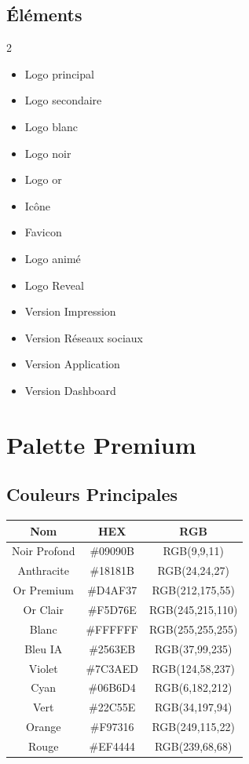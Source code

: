 \documentclass[12pt,a4paper,oneside]{book}
\begin{document}
\section{Éléments}
\begin{multicols}{2}
\begin{itemize}
\item Logo principal
\item Logo secondaire
\item Logo blanc
\item Logo noir
\item Logo or
\item Icône
\item Favicon
\item Logo animé
\item Logo Reveal
\item Version Impression
\item Version Réseaux sociaux
\item Version Application
\item Version Dashboard
\end{itemize}
\end{multicols}

\chapter{Palette Premium}

\section{Couleurs Principales}
\begin{center}
\begin{tabular}{|c|c|c|}
\hline
\rowcolor{noir}
\color{white}Nom & \color{white}HEX & \color{white}RGB \\
\hline
Noir Profond & \#09090B & RGB(9,9,11) \\
\hline
Anthracite & \#18181B & RGB(24,24,27) \\
\hline
Or Premium & \#D4AF37 & RGB(212,175,55) \\
\hline
Or Clair & \#F5D76E & RGB(245,215,110) \\
\hline
Blanc & \#FFFFFF & RGB(255,255,255) \\
\hline
Bleu IA & \#2563EB & RGB(37,99,235) \\
\hline
Violet & \#7C3AED & RGB(124,58,237) \\
\hline
Cyan & \#06B6D4 & RGB(6,182,212) \\
\hline
Vert & \#22C55E & RGB(34,197,94) \\
\hline
Orange & \#F97316 & RGB(249,115,22) \\
\hline
Rouge & \#EF4444 & RGB(239,68,68) \\
\hline
\end{tabular}
\end{center}
\end{document}
